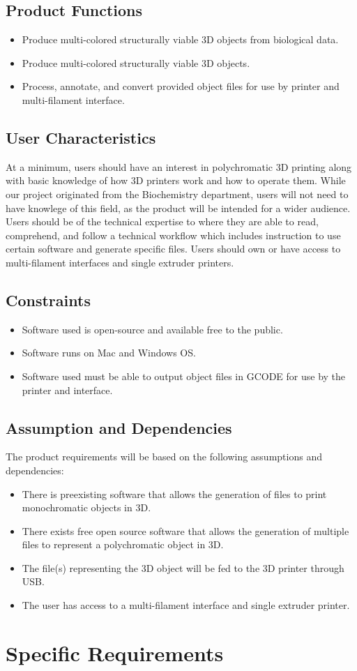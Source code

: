 \documentclass[letterpaper, onecolumn, draftclsnofoot, 10pt, compsoc]{IEEEtran}
\begin{document}
\subsection{Product Functions} %
\begin{itemize}
	\item Produce multi-colored structurally viable 3D objects from biological data.
    \item Produce multi-colored structurally viable 3D objects.
    \item Process, annotate, and convert provided object files for use by printer and multi-filament interface.
\end{itemize}

\subsection{User Characteristics} %
At a minimum, users should have an interest in polychromatic 3D printing along with basic knowledge of how 3D printers work and how to operate them. 
While our project originated from the Biochemistry department, users will not need to have knowlege of this field, as the product will be intended for a wider audience.
Users should be of the technical expertise to where they are able to read, comprehend, and follow a technical workflow which includes instruction to use certain software and generate specific files. 
Users should own or have access to multi-filament interfaces and single extruder printers. 

\subsection{Constraints} %
\begin{itemize}
	\item Software used is open-source and available free to the public.
    \item Software runs on Mac and Windows OS.
    \item Software used must be able to output object files in GCODE for use by the printer and interface.
\end{itemize}

\subsection{Assumption and Dependencies} %
The product requirements will be based on the following assumptions and dependencies: 
\begin{itemize}
  \item There is preexisting software that allows the generation of files to print monochromatic objects in 3D.
  \item There exists free open source software that allows the generation of multiple files to represent a polychromatic object in 3D.
  \item The file(s) representing the 3D object will be fed to the 3D printer through USB. 
  \item The user has access to a multi-filament interface and single extruder printer.
\end{itemize}

\section{Specific Requirements} %

\cite{8colorprint}

{}

\end{document}
